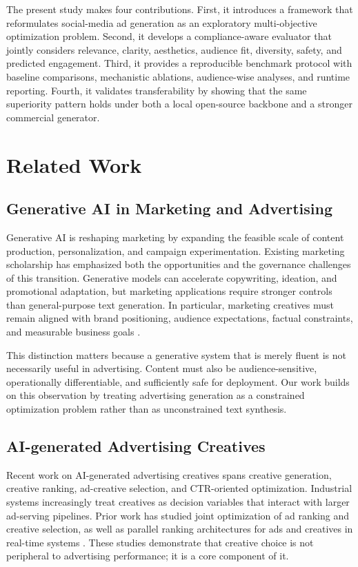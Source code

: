 \documentclass[preprint,12pt]{elsarticle}
\begin{document}
The present study makes four contributions. First, it introduces a framework that reformulates social-media ad generation as an exploratory multi-objective optimization problem. Second, it develops a compliance-aware evaluator that jointly considers relevance, clarity, aesthetics, audience fit, diversity, safety, and predicted engagement. Third, it provides a reproducible benchmark protocol with baseline comparisons, mechanistic ablations, audience-wise analyses, and runtime reporting. Fourth, it validates transferability by showing that the same superiority pattern holds under both a local open-source backbone and a stronger commercial generator.

\section{Related Work}

\subsection{Generative AI in Marketing and Advertising}

Generative AI is reshaping marketing by expanding the feasible scale of content production, personalization, and campaign experimentation. Existing marketing scholarship has emphasized both the opportunities and the governance challenges of this transition. Generative models can accelerate copywriting, ideation, and promotional adaptation, but marketing applications require stronger controls than general-purpose text generation. In particular, marketing creatives must remain aligned with brand positioning, audience expectations, factual constraints, and measurable business goals \citep{grewal2025,heitmann2024}.

This distinction matters because a generative system that is merely fluent is not necessarily useful in advertising. Content must also be audience-sensitive, operationally differentiable, and sufficiently safe for deployment. Our work builds on this observation by treating advertising generation as a constrained optimization problem rather than as unconstrained text synthesis.

\subsection{AI-generated Advertising Creatives}

Recent work on AI-generated advertising creatives spans creative generation, creative ranking, ad-creative selection, and CTR-oriented optimization. Industrial systems increasingly treat creatives as decision variables that interact with larger ad-serving pipelines. Prior work has studied joint optimization of ad ranking and creative selection, as well as parallel ranking architectures for ads and creatives in real-time systems \citep{lin2022,yang2024aaai}. These studies demonstrate that creative choice is not peripheral to advertising performance; it is a core component of it.
\end{document}

